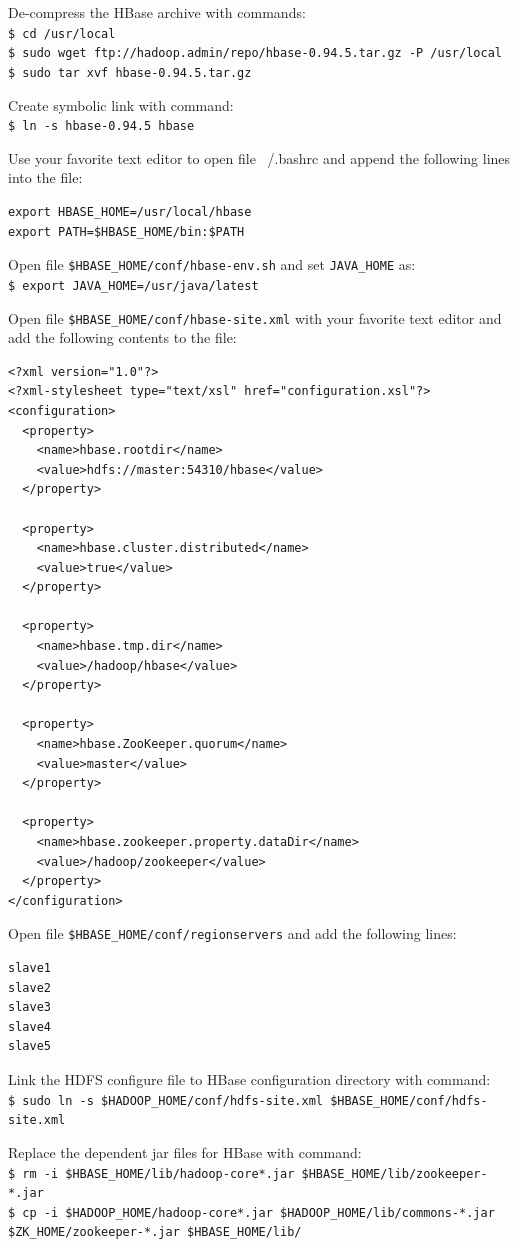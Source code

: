 De-compress the HBase archive with commands: \\
\verb|$ cd /usr/local| \\
\verb|$ sudo wget ftp://hadoop.admin/repo/hbase-0.94.5.tar.gz -P /usr/local | \\
\verb|$ sudo tar xvf hbase-0.94.5.tar.gz |

Create symbolic link with command: \\
\verb|$ ln -s hbase-0.94.5 hbase|

Use your favorite text editor to open file ~/.bashrc and append the following lines into the file:
\begin{verbatim}
export HBASE_HOME=/usr/local/hbase
export PATH=$HBASE_HOME/bin:$PATH
\end{verbatim}

Open file \verb|$HBASE_HOME/conf/hbase-env.sh| and set \verb|JAVA_HOME| as: \\
\verb|$ export JAVA_HOME=/usr/java/latest|

Open file \verb|$HBASE_HOME/conf/hbase-site.xml| with your favorite text editor and add the following contents to the file:
\begin{verbatim}
<?xml version="1.0"?>
<?xml-stylesheet type="text/xsl" href="configuration.xsl"?>
<configuration>
  <property>
    <name>hbase.rootdir</name>
    <value>hdfs://master:54310/hbase</value>
  </property>

  <property>
    <name>hbase.cluster.distributed</name>
    <value>true</value>
  </property>

  <property>
    <name>hbase.tmp.dir</name>
    <value>/hadoop/hbase</value>
  </property>

  <property>
    <name>hbase.ZooKeeper.quorum</name>
    <value>master</value>
  </property>

  <property>
    <name>hbase.zookeeper.property.dataDir</name>
    <value>/hadoop/zookeeper</value>
  </property>
</configuration>
\end{verbatim}

Open file \verb|$HBASE_HOME/conf/regionservers| and add the following lines:
\begin{verbatim}
slave1
slave2
slave3
slave4
slave5
\end{verbatim}

Link the HDFS configure file to HBase configuration directory with command: \\
\verb|$ sudo ln -s $HADOOP_HOME/conf/hdfs-site.xml $HBASE_HOME/conf/hdfs-site.xml|

Replace the dependent jar files for HBase with command: \\
\verb|$ rm -i $HBASE_HOME/lib/hadoop-core*.jar $HBASE_HOME/lib/zookeeper-*.jar| \\
\verb|$ cp -i $HADOOP_HOME/hadoop-core*.jar $HADOOP_HOME/lib/commons-*.jar $ZK_HOME/zookeeper-*.jar $HBASE_HOME/lib/|

